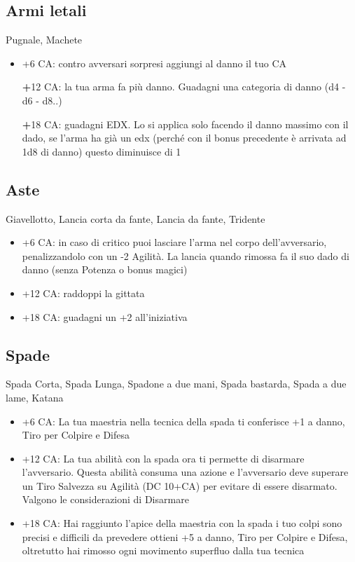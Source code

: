 \documentclass[a4paper,11pt,twoside,openany]{book}
\begin{document}
\subsection{Armi letali} Pugnale, Machete

\begin{itemize}

	\item +6 CA: contro avversari sorpresi aggiungi al danno il tuo CA

	      \textbf +12 CA: la tua arma fa più danno. Guadagni una categoria di danno (d4 - d6 - d8..)

	      \textbf +18 CA: guadagni EDX. Lo si applica solo facendo il danno massimo con il dado, se l'arma ha già un edx (perché con il bonus precedente è arrivata ad 1d8 di danno)
	      questo diminuisce di 1

\end{itemize}

\subsection{Aste} Giavellotto, Lancia corta da fante, Lancia da fante, Tridente

\begin{itemize}

	\item +6 CA: in caso di critico puoi lasciare l'arma nel corpo dell'avversario,
	      penalizzandolo con un -2 Agilità. La lancia quando rimossa fa il suo dado di danno (senza
	      Potenza o bonus magici)

	\item +12 CA: raddoppi la gittata

	\item +18 CA: guadagni un +2 all'iniziativa
\end{itemize}

\subsection{Spade} Spada Corta, Spada Lunga, Spadone a due mani, Spada bastarda, Spada a due lame, Katana

\begin{itemize}

	\item +6 CA: La tua maestria nella tecnica della spada ti conferisce +1
	      a danno, Tiro per Colpire e Difesa

	\item +12 CA: La tua abilità con la spada ora ti permette di disarmare l'avversario. Questa abilità consuma una azione e l'avversario deve superare un Tiro Salvezza su Agilità (DC 10+CA) per evitare di essere disarmato. Valgono le considerazioni di Disarmare

	\item +18 CA: Hai raggiunto l'apice della maestria con la spada i tuo colpi sono precisi e difficili da prevedere ottieni +5 a danno, Tiro per Colpire e Difesa, oltretutto hai rimosso ogni movimento superfluo dalla tua tecnica
\end{itemize}
\end{document}
